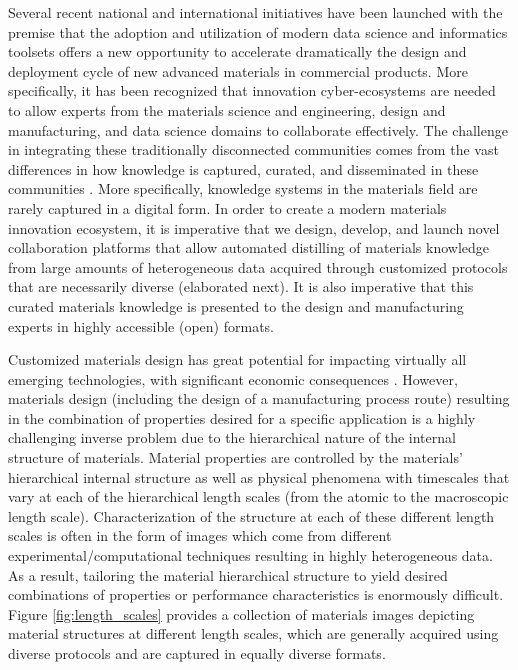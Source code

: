 \documentclass{bmcart}
\begin{document}
Several recent national and international initiatives \cite{anderson2011report, MGIwhite, MGI2014} have been launched with the premise that the adoption and utilization of modern data science and informatics toolsets offers a new opportunity to accelerate dramatically the design and deployment cycle of new advanced materials in commercial products. More specifically, it has been recognized that innovation cyber-ecosystems \cite{mcdowell2016materials} are needed to allow experts from the materials science and engineering, design and manufacturing, and data science domains to collaborate effectively. The challenge in integrating these traditionally disconnected communities comes from the vast differences in how knowledge is captured, curated, and disseminated in these communities \cite{kalidindi2015data}. More specifically, knowledge systems in the materials field are rarely captured in a digital form. In order to create a modern materials innovation ecosystem, it is imperative that we design, develop, and launch novel collaboration platforms that allow automated distilling of materials knowledge from large amounts of heterogeneous data acquired through customized protocols that are necessarily diverse (elaborated next). It is also imperative that this curated materials knowledge is presented to the design and manufacturing experts in highly accessible (open) formats.

Customized materials design has great potential for impacting
virtually all emerging technologies, with significant economic
consequences \cite{ward2012materials, allison2006integrated, MGIwhite,
  MGI2014, allison2011integrated, olson2000designing,
  national2008integrated, schmitz2012integrative, robinson2013tms,
  allisonintegrated, TMSfieldstudy}. However, materials design
(including the design of a manufacturing process route) resulting in
the combination of properties desired for a specific application is a
highly challenging inverse problem due to the hierarchical nature of
the internal structure of materials. Material properties are
controlled by the materials' hierarchical internal structure as well
as physical phenomena with timescales that vary at each of the
hierarchical length scales (from the atomic to the macroscopic length
scale). Characterization of the structure at each of these different
length scales is often in the form of images which come from different
experimental/computational techniques resulting in highly
heterogeneous data. As a result, tailoring the material hierarchical
structure to yield desired combinations of properties or performance
characteristics is enormously difficult. Figure
\ref{fig:length_scales} provides a collection of materials images
depicting material structures at different length scales, which are
generally acquired using diverse protocols and are captured in equally
diverse formats.
\end{document}
